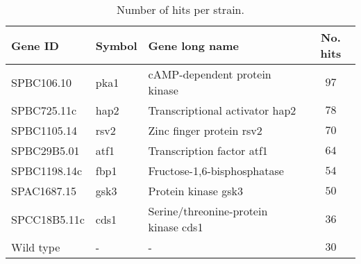 \begin{table}[hbt!]
    \centering
    \caption{%
        Number of hits per strain.
    }
    \label{table:hits-per-id}
    \begin{tabular}{lllc}
        \toprule
        \textbf{Gene ID} & \textbf{Symbol} & \textbf{Gene long name} & \textbf{No. hits} \\
        \midrule
        SPBC106.10 & pka1 & cAMP-dependent protein kinase & $97$ \\
        SPBC725.11c & hap2 & Transcriptional activator hap2 & $78$ \\
        SPBC1105.14 & rsv2 & Zinc finger protein rsv2 & $70$ \\
        SPBC29B5.01 & atf1 & Transcription factor atf1 & $64$ \\
        SPBC1198.14c & fbp1 & Fructose-1,6-bisphosphatase & $54$ \\
        SPAC1687.15 & gsk3 & Protein kinase gsk3 & $50$ \\
        SPCC18B5.11c & cds1 & Serine/threonine-protein kinase cds1 & $36$ \\
        Wild type & - & - & $30$ \\
        \bottomrule
    \end{tabular}
\end{table}

